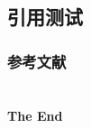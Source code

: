 \documentclass[presentation,aspectratio=1610]{beamer}
\begin{document}

\subsection{引用测试}
  
\begin{frame}[t,allowframebreaks]
	\frametitle{参考文献}
	\nocite{*}
	\printbibliography
\end{frame}


\section{}

\begin{frame}{}
	\centering
		\Huge\bfseries
	\textcolor{whucolor}{The End}
\end{frame}

\end{document}
